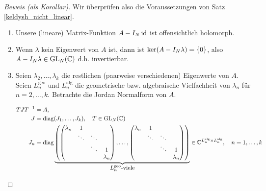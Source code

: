\begin{proof}[Beweis (als Korollar)]

    Wir überprüfen also die Voraussetzungen von Satz \ref{keldysh_nicht_linear}.

    \begin{enumerate}[label = \arabic*.]

        \item Unsere (lineare) Matrix-Funktion $A - I_N \operatorname{id}$ ist offensichtlich holomorph.
        
        \item Wenn $\lambda$ kein Eigenwert von $A$ ist, dann ist $\ker (A - I_N \lambda) = {\left \{ 0 \right \}}$, also $A - I_N \lambda \in \operatorname{GL}_N(\mathbb{C})$ d.h. invertierbar.
        
        \item Seien $\lambda_2, \dots, \lambda_k$ die restlichen (paarweise verschiedenen) Eigenwerte von $A$.
        Seien $L_n^\mathrm{geo}$ und $L_n^\mathrm{alg}$ die geometrische bzw. algebraische Vielfachheit von $\lambda_n$ für $n = 2, \dots, k$.
        Betrachte die Jordan Normalform von $A$.
    
        \begin{align*}
            T J T^{-1} & = A, \\
            J & = \operatorname{diag} (J_1, \dots, J_k),
            \quad
            T \in \operatorname{GL}_N(\mathbb{C}) \\
            J_n
            & =
            \operatorname{diag}
            \underbrace
            {
                {\left ( 
                    \begin{pmatrix}
                        \lambda_n & 1      &        &           \\
                                  & \ddots & \ddots &           \\
                                  &        & \ddots & 1         \\
                                  &        &        & \lambda_n \\
                    \end{pmatrix},
                    \dots,
                    \begin{pmatrix}
                        \lambda_n & 1      &        &           \\
                                  & \ddots & \ddots &           \\
                                  &        & \ddots & 1         \\
                                  &        &        & \lambda_n \\
                    \end{pmatrix}
                 \right )}
            }_{
                \displaystyle
                L_n^\mathrm{geo} \text{-viele}
            }
            \in
            \mathbb{C}^{
                L_n^\mathrm{alg}
                \times
                L_n^\mathrm{alg}
            },
            \quad
            n = 1, \dots, k
        \end{align*}
    

\end{enumerate}
\end{proof}
